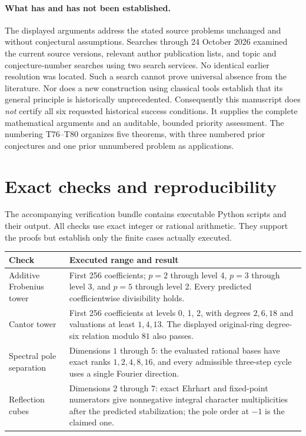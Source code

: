 \documentclass[11pt,a4paper]{article}
\theoremstyle{definition}
\theoremstyle{remark}\newtheorem{remark}[lemma]{Remark}
\begin{document}
\paragraph{What has and has not been established.}
The displayed arguments address the stated source problems unchanged and
without conjectural assumptions. Searches through 24 October 2026 examined
the current source versions, relevant author publication lists, and topic
and conjecture-number searches using two search services. No identical
earlier resolution was located. Such a search cannot prove universal
absence from the literature. Nor does a new construction using classical
tools establish that its general principle is historically unprecedented.
Consequently this manuscript does \emph{not} certify all six requested
historical success conditions. It supplies the complete mathematical
arguments and an auditable, bounded priority assessment. The numbering
T76--T80 organizes five theorems, with three numbered prior conjectures and
one prior unnumbered problem as applications.

\appendix
\section{Exact checks and reproducibility}

The accompanying verification bundle contains executable Python scripts and
their output. All checks use exact integer or rational arithmetic. They
support the proofs but establish only the finite cases actually executed.

\begin{center}\small
\begin{tabular}{@{}p{}p{}@{}}
\toprule
Check & Executed range and result \\
\midrule
Additive Frobenius tower & First 256 coefficients; $p=2$ through level 4,
$p=3$ through level 3, and $p=5$ through level 2. Every predicted
coefficientwise divisibility holds.\\
Cantor tower & First 256 coefficients at levels 0, 1, 2, with degrees
$2,6,18$ and valuations at least $1,4,13$. The displayed original-ring
degree-six relation modulo $81$ also passes.\\
Spectral pole separation & Dimensions $1$ through $5$: the evaluated rational
bases have exact ranks $1,2,4,8,16$, and every admissible three-step cycle
uses a single Fourier direction.\\
Reflection cubes & Dimensions $2$ through $7$: exact Ehrhart and fixed-point
numerators give nonnegative integral character multiplicities after the
predicted stabilization; the pole order at $-1$ is the claimed one.\\
\bottomrule
\end{tabular}
\end{center}
\end{document}

